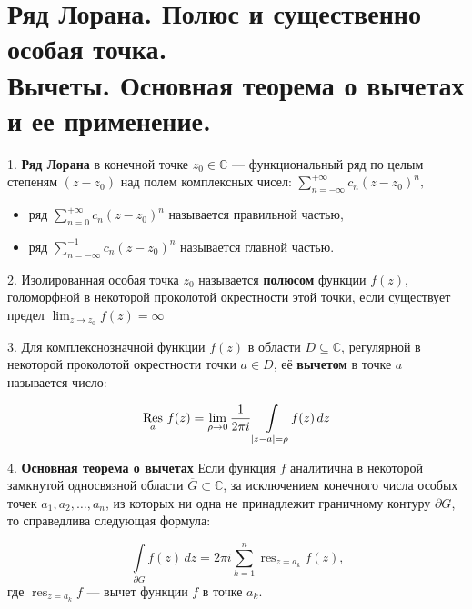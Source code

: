 \section{
    Ряд Лорана. Полюс и существенно особая точка. \\
    Вычеты. Основная теорема о вычетах и ее применение. 
}

1. \textbf{Ряд Лорана} в конечной точке 
${\displaystyle z_{0}\in \mathbb {C} }$ — функциональный ряд по целым степеням ${\displaystyle (z-z_{0})}$
 над полем комплексных чисел:
${\displaystyle \sum _{n=-\infty }^{+\infty }c_{n}(z-z_{0})^{n},\quad }$
\begin{itemize}
    \item ряд ${\displaystyle \sum _{n=0}^{+\infty }c_{n}(z-z_{0})^{n}}$
    называется правильной частью,
    \item ряд ${\displaystyle \sum _{n=-\infty }^{-1}{c_{n}}{(z-z_{0})^{n}}}$
    называется главной частью.
\end{itemize}

2. Изолированная особая точка ${\displaystyle z_{0}}$ называется \textbf{полюсом} функции 
${\displaystyle f(z)}$, голоморфной в некоторой проколотой окрестности этой точки,
если существует предел ${\displaystyle \lim _{z\to {z_{0}}}f(z)=\infty }$

3. Для комплекснозначной функции ${\displaystyle f(z)}$ в области 
${\displaystyle D\subseteq \mathbb {C} }$, регулярной в некоторой проколотой
окрестности точки ${\displaystyle a\in D}$, её \textbf{вычетом} в точке ${\displaystyle a}$ называется число:

$${\displaystyle \mathop {\mathrm {Res} } _{a}\,f(z)=\lim _{\rho \to 0}{1 \over {2\pi i}}\int \limits _{|z-a|=\rho }\!f(z)\,dz}$$

4. \textbf{Основная теорема о вычетах}
Если функция ${\displaystyle f}$ аналитична в некоторой замкнутой односвязной области 
${\displaystyle {\overline {G}}\subset \mathbb {C} }$, за исключением конечного числа 
особых точек ${\displaystyle a_{1},a_{2},\dots ,a_{n}}$, из которых ни одна не принадлежит
граничному контуру ${\displaystyle \partial G}$, то справедлива следующая формула:

$${\displaystyle ~\int \limits _{\partial G}f(z)\,dz=2\pi i\sum _{k=1}^{n}\mathop {\mathrm {res} } _{z=a_{k}}f(z),}$$
где ${\displaystyle \mathop {\mathrm {res} } _{z=a_{k}}f}$ — вычет функции ${\displaystyle f}$ в точке ${\displaystyle a_{k}}$.
